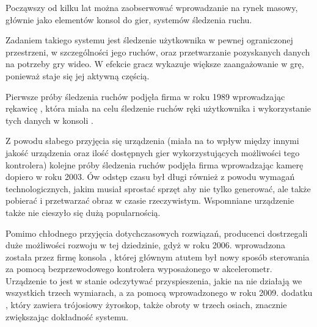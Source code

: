 \label{ch:current_state} %

Począwszy od kilku lat można zaobserwować wprowadzanie na rynek masowy, głównie jako elementów konsol do gier, systemów śledzenia ruchu.

Zadaniem takiego systemu jest śledzenie użytkownika w pewnej ograniczonej przestrzeni, w szczególności jego ruchów, oraz przetwarzanie pozyskanych danych na potrzeby gry wideo. W efekcie gracz wykazuje większe zaangażowanie w grę, ponieważ staje się jej aktywną częścią.

Pierwsze próby śledzenia ruchów podjęła firma  w roku 1989 wprowadzając rękawicę , która miała na celu śledzenie ruchów ręki użytkownika i wykorzystanie tych danych w konsoli .

Z powodu słabego przyjęcia się urządzenia (miała na to wpływ między innymi jakość urządzenia oraz ilość dostępnych gier wykorzystujących możliwości tego kontrolera) kolejne próby śledzenia ruchów podjęła firma  wprowadzając kamerę  dopiero w roku 2003. Ów odstęp czasu był długi również z powodu wymagań technologicznych, jakim musiał sprostać sprzęt aby nie tylko generować, ale także pobierać i przetwarzać obraz w czasie rzeczywistym. Wspomniane urządzenie także nie cieszyło się dużą popularnością.

Pomimo chłodnego przyjęcia dotychczasowych rozwiązań, producenci dostrzegali duże możliwości rozwoju w tej dziedzinie, gdyż w roku 2006. wprowadzona została przez firmę  konsola , której głównym atutem był nowy sposób sterowania \ppauza za pomocą bezprzewodowego kontrolera wyposażonego w akcelerometr. Urządzenie to jest w stanie odczytywać przyspieszenia, jakie na nie działają we wszystkich trzech wymiarach, a za pomocą wprowadzonego w roku 2009. dodatku , który zawiera trójosiowy żyroskop, także obroty w trzech osiach, znacznie zwiększając dokładność systemu.

